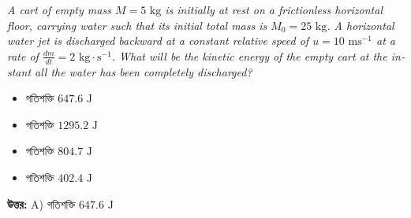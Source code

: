 \documentclass[12pt, a4paper]{article}
\begin{document}
{{\begin{tcolorbox}[questionbox={প্রশ্ন (Question) 41}]
    \vspace{0.8em}
    \begin{english}
    \noindent\textit{\color{darkgray}
    A cart of empty mass $M = 5\text{ kg}$ is initially at rest on a frictionless horizontal floor, carrying water such that its initial total mass is $M_0 = 25\text{ kg}$. A horizontal water jet is discharged backward at a constant relative speed of $u = 10\text{ ms}^{-1}$ at a rate of $\frac{dm}{dt} = 2\text{ kg}\cdot\text{s}^{-1}$. What will be the kinetic energy of the empty cart at the instant all the water has been completely discharged?
    }
    \end{english}
\end{tcolorbox}

\vspace{1em}
\begin{center}
\end{center}
\vspace{1em}

\begin{itemize}[label={}, leftmargin=1cm, itemsep=0.5em]
    \item[\textbf{A)}] গতিশক্তি $647.6\text{ J}$
    \item[\textbf{B)}] গতিশক্তি $1295.2\text{ J}$
    \item[\textbf{C)}] গতিশক্তি $804.7\text{ J}$
    \item[\textbf{D)}] গতিশক্তি $402.4\text{ J}$
\end{itemize}

\vspace{0.5em}
\begin{tcolorbox}[answerbox]
    \textbf{\color{success} উত্তর:} A) গতিশক্তি $647.6\text{ J}$
\end{tcolorbox}
\vspace{1em}

}}
\end{document}
